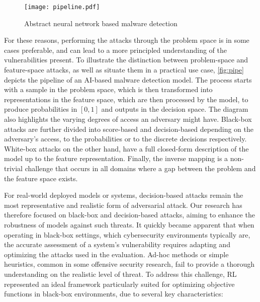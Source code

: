 \begin{figure}
    \centering
    \texttt{[image: pipeline.pdf]}
    \caption{Abstract neural network based malware detection}
    \label{fig:pipe}
\end{figure}

For these reasons, performing the attacks through the problem space is in some cases preferable, and can lead to a more principled understanding of the vulnerabilities present.
To illustrate the distinction between problem-space and feature-space attacks, as well as situate them in a practical use case, \autoref{fig:pipe} depicts the pipeline of an AI-based malware detection model.
The process starts with a sample in the problem space, which is then transformed into representations in the feature space, which are then processed by the model, to produce probabilities in $[0,1]$ and outputs in the decision space.
The diagram also highlights the varying degrees of access an adversary might have.
Black-box attacks are further divided into score-based and decision-based depending on the adversary's access, to the probabilities or to the discrete decisions respectively.
White-box attacks on the other hand, have a full closed-form description of the model up to the feature representation.
Finally, the inverse mapping is a non-trivial challenge that occurs in all domains where a gap between the problem and the feature space exists.

For real-world deployed models or systems, decision-based attacks remain the most representative and realistic form of adversarial attack.
Our research has therefore focused on black-box and decision-based attacks, aiming to enhance the robustness of models against such threats.
It quickly became apparent that when operating in black-box settings, which cybersecurity environments typically are, the accurate assessment of a system's vulnerability requires adapting and optimizing the attacks used in the evaluation.
Ad-hoc methods or simple heuristics, common in some offensive security research, fail to provide a thorough understanding on the realistic level of threat.
To address this challenge, \gls{RL} represented an ideal framework particularly suited for optimizing objective functions in black-box environments, due to several key characteristics:

